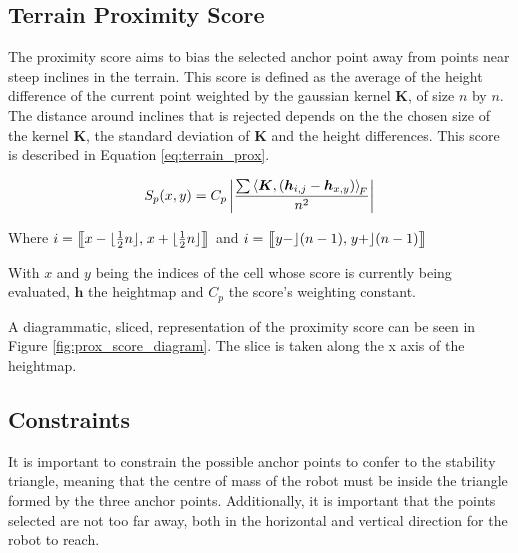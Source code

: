     \subsection{Terrain Proximity Score}
    The proximity score aims to bias the selected anchor point away from points near steep inclines in the terrain. This score is defined as the average of the height
    difference of the current point weighted by the gaussian kernel \(\boldsymbol{K}\), of size \(n\) by \(n\). The distance around inclines that is rejected depends on the the
    chosen size of the kernel \(\boldsymbol{K}\), the standard deviation of \(\boldsymbol{K}\) and the height differences. This score is described in Equation
    \ref{eq:terrain_prox}.

    \begin{equation} \label{eq:terrain_prox}
        S_p(x,y) = C_p\left|\frac{\sum\left\langle\boldsymbol{K},(\boldsymbol{h}_{i,j}-\boldsymbol{h}_{x,y})\right\rangle _{\mkern-3mu F}}{n^2}\right|
    \end{equation}

    \begin{center}
        Where \(i = \big[\mkern-4.7mu\big[x- \lfloor\frac{1}{2}n\rfloor,\mkern2mu x+\lfloor\frac{1}{2}n\rfloor\big]\mkern-4.7mu\big]\) 
        and \(i = \big[\mkern-4.7mu\big[y-\rfloor (n-1),\mkern2mu y+\rfloor (n-1)\big]\mkern-4.7mu\big]\)
    \end{center}
    
    \noindent
    With \(x\) and \(y\) being the indices of the cell whose score is currently being evaluated, \(\boldsymbol{h}\) the
    heightmap and \(C_p\) the score's weighting constant.
    
    A diagrammatic, sliced, representation of the proximity score can be seen in Figure \ref{fig:prox_score_diagram}. The
    slice is taken along the x axis of the heightmap.

    \subsection{Constraints}
    It is important to constrain the possible anchor points to confer to the stability triangle,
    meaning that the centre of mass of the robot must be inside the triangle formed by the three
    anchor points. Additionally, it is important that the points selected are not too far away,
    both in the horizontal and vertical direction for the robot to reach.



